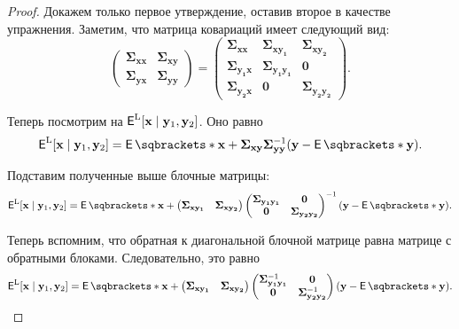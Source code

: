 \begin{proof}
	Докажем только первое утверждение, оставив второе в качестве упражнения. 
	Заметим, что матрица ковариаций имеет следующий вид:
	\[
		\left(
			\begin{array}{c|c}
				\bm{\Sigma}_{\mathbf{xx}} & \bm{\Sigma}_{\mathbf{xy}} \\
				\hline
				\bm{\Sigma}_{\mathbf{yx}} & \bm{\Sigma}_{\mathbf{yy}}
			\end{array}
		\right)
		=
		\left(
			\begin{array}{c|cc}
				\bm{\Sigma}_{\mathbf{xx}} & \bm{\Sigma}_{\mathbf{xy_{1}}} & 
				\bm{\Sigma}_{\mathbf{xy_{2}}} \\
				\hline
				\bm{\Sigma}_{\mathbf{y_{1}x}} & 
				\bm{\Sigma}_{\mathbf{y_{1}y_{1}}} & \mathbf{0} \\
				\bm{\Sigma}_{\mathbf{y_{2}x}} & \mathbf{0} & 
				\bm{\Sigma}_{\mathbf{y_{2}y_{2}}}
			\end{array}
		\right).
	\]
	
	Теперь посмотрим на \(\E^{\mathrm{L}}[\mathbf{x} \mid \mathbf{y}_{1}, 
	\mathbf{y}_{2}]\). Оно равно
	\[
		\E^{\mathrm{L}}[\mathbf{x} \mid \mathbf{y}_{1}, \mathbf{y}_{2}] = 
		\E{\mathbf{x}} + \bm{\Sigma}_{\mathbf{xy}} 
		\bm{\Sigma}_{\mathbf{yy}}^{-1}(\mathbf{y} - \E{\mathbf{y}}).
	\]
	
	Подставим полученные выше блочные матрицы:
	\[
		\E^{\mathrm{L}}[\mathbf{x} \mid \mathbf{y}_{1}, \mathbf{y}_{2}] = 
		\E{\mathbf{x}} +
		\begin{pmatrix}
			\bm{\Sigma}_{\mathbf{xy_{1}}} & \bm{\Sigma}_{\mathbf{xy_{2}}}
		\end{pmatrix}
		\begin{pmatrix}
			\bm{\Sigma}_{\mathbf{y_{1}y_{1}}} & \mathbf{0} \\
			\mathbf{0} & \bm{\Sigma}_{\mathbf{y_{2}y_{2}}}
		\end{pmatrix}^{-1}
		(\mathbf{y} - \E{\mathbf{y}}).
	\]
	
	Теперь вспомним, что обратная к диагональной блочной матрице равна матрице 
	с обратными блоками. Следовательно, это равно
	\[
		\E^{\mathrm{L}}[\mathbf{x} \mid \mathbf{y}_{1}, \mathbf{y}_{2}] = 
		\E{\mathbf{x}} +
		\begin{pmatrix}
			\bm{\Sigma}_{\mathbf{xy_{1}}} & \bm{\Sigma}_{\mathbf{xy_{2}}}
		\end{pmatrix}
		\begin{pmatrix}
			\bm{\Sigma}_{\mathbf{y_{1}y_{1}}}^{-1} & \mathbf{0} \\
			\mathbf{0} & \bm{\Sigma}_{\mathbf{y_{2}y_{2}}}^{-1}
		\end{pmatrix}
		(\mathbf{y} - \E{\mathbf{y}}).
	\]
	

\end{proof}
